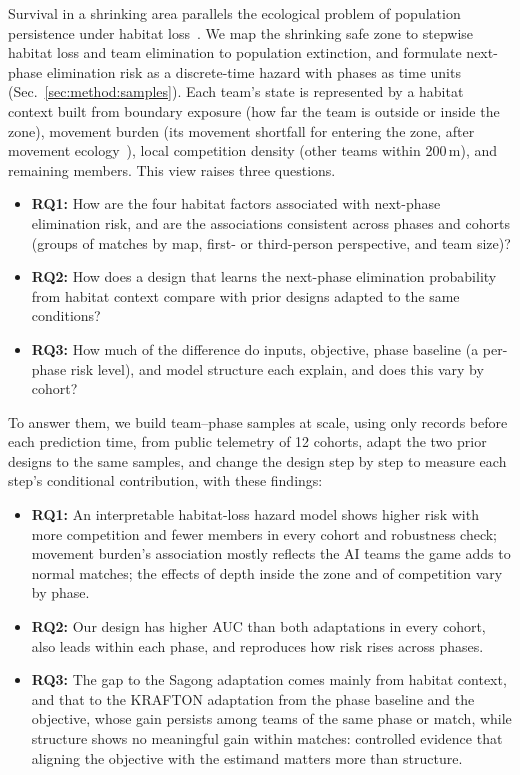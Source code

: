 \documentclass[conference]{IEEEtran}
\begin{document}
Survival in a shrinking area parallels the ecological problem of population persistence under habitat loss~\cite{Fahrig03}.
We map the shrinking safe zone to stepwise habitat loss and team elimination to population extinction, and formulate next-phase elimination risk as a discrete-time hazard with phases as time units (Sec.~\ref{sec:method:samples}).
Each team's state is represented by a habitat context built from boundary exposure (how far the team is outside or inside the zone), movement burden (its movement shortfall for entering the zone, after movement ecology~\cite{Nathan08}), local competition density (other teams within 200\,m), and remaining members.
This view raises three questions.
\begin{itemize}
    \item \textbf{RQ1:} How are the four habitat factors associated with next-phase elimination risk, and are the associations consistent across phases and cohorts (groups of matches by map, first- or third-person perspective, and team size)?
    \item \textbf{RQ2:} How does a design that learns the next-phase elimination probability from habitat context compare with prior designs adapted to the same conditions?
    \item \textbf{RQ3:} How much of the difference do inputs, objective, phase baseline (a per-phase risk level), and model structure each explain, and does this vary by cohort?
\end{itemize}

To answer them, we build team--phase samples at scale, using only records before each prediction time, from public telemetry of 12 cohorts, adapt the two prior designs to the same samples, and change the design step by step to measure each step's conditional contribution, with these findings:
\begin{itemize}
    \item \textbf{RQ1:} An interpretable habitat-loss hazard model shows higher risk with more competition and fewer members in every cohort and robustness check; movement burden's association mostly reflects the AI teams the game adds to normal matches; the effects of depth inside the zone and of competition vary by phase.
    \item \textbf{RQ2:} Our design has higher AUC than both adaptations in every cohort, also leads within each phase, and reproduces how risk rises across phases.
    \item \textbf{RQ3:} The gap to the Sagong adaptation comes mainly from habitat context, and that to the KRAFTON adaptation from the phase baseline and the objective, whose gain persists among teams of the same phase or match, while structure shows no meaningful gain within matches: controlled evidence that aligning the objective with the estimand matters more than structure.
\end{itemize}
\end{document}
